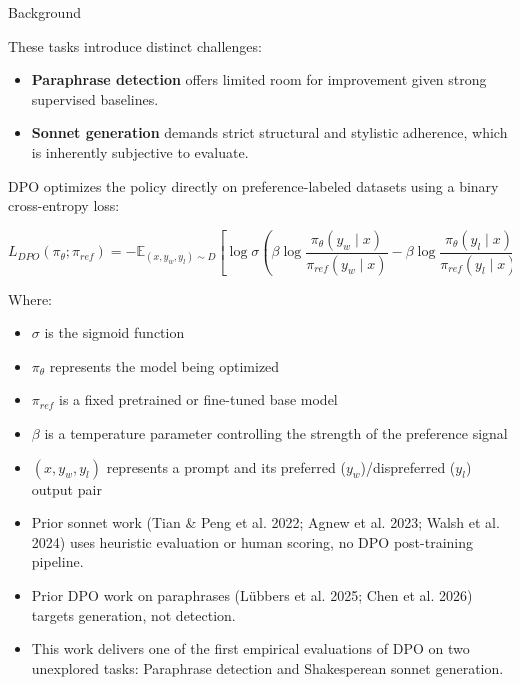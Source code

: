 \documentclass[final]{beamer}
\newlength{\colwidth}
\begin{document}
\begin{frame}[t]
\begin{columns}[t]
\begin{column}{\colwidth}
  \begin{block}{Background}

    These tasks introduce distinct challenges:
    \begin{itemize}
      \item \textbf{Paraphrase detection} offers limited room for improvement given strong supervised baselines.
      \item \textbf{Sonnet generation} demands strict structural and stylistic adherence, which is inherently subjective to evaluate.
    \end{itemize}

    
    DPO optimizes the policy directly on preference-labeled datasets using a binary cross-entropy loss:
    
    $$
    L_{DPO}(\pi_\theta; \pi_{ref}) = - \mathbb{E}_{(x, y_w, y_l) \sim D} \left[ \log \sigma \left( \beta \log \frac{\pi_\theta(y_w \mid x)}{\pi_{ref}(y_w \mid x)} - \beta \log \frac{\pi_\theta(y_l \mid x)}{\pi_{ref}(y_l \mid x)} \right) \right]
    $$
    
    Where:
    \begin{itemize}
      \item $\sigma$ is the sigmoid function
      \item $\pi_\theta$ represents the model being optimized
      \item $\pi_{ref}$ is a fixed pretrained or fine-tuned base model
      \item $\beta$ is a temperature parameter controlling the strength of the preference signal
      \item $(x, y_w, y_l)$ represents a prompt and its preferred ($y_w$)/dispreferred ($y_l$) output pair
    \end{itemize}

    \begin{itemize}
      \item Prior sonnet work (Tian & Peng et al. 2022; Agnew et al. 2023; Walsh et al. 2024) uses heuristic evaluation or human scoring, no DPO post-training pipeline.
      \item Prior DPO work on paraphrases (Lübbers et al. 2025; Chen et al. 2026) targets generation, not detection. 
      \item This work delivers one of the first empirical evaluations of DPO on two unexplored tasks: Paraphrase detection and Shakesperean sonnet generation.
    \end{itemize}



\end{block}
\end{column}
\end{columns}
\end{frame}
\end{document}
